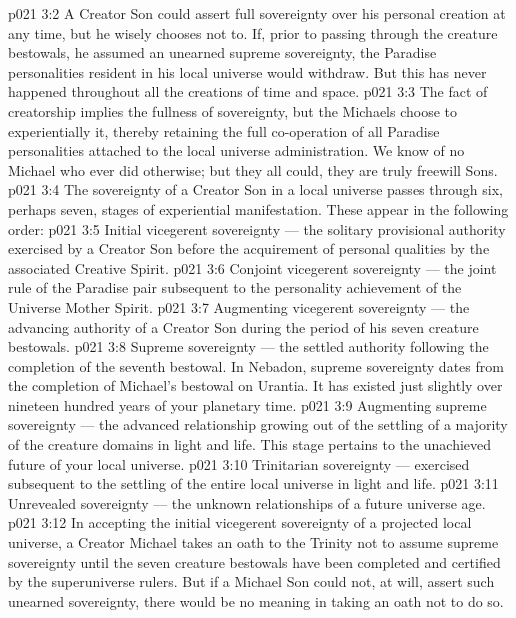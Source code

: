 \vs p021 3:2 \pc A Creator Son could assert full sovereignty over his personal creation at any time, but he wisely chooses not to. If, prior to passing through the creature bestowals, he assumed an unearned supreme sovereignty, the Paradise personalities resident in his local universe would withdraw. But this has never happened throughout all the creations of time and space.
\vs p021 3:3 The fact of creatorship implies the fullness of sovereignty, but the Michaels choose to experientially  it, thereby retaining the full co\hyp{}operation of all Paradise personalities attached to the local universe administration. We know of no Michael who ever did otherwise; but they all could, they are truly freewill Sons.
\vs p021 3:4 \pc The sovereignty of a Creator Son in a local universe passes through six, perhaps seven, stages of experiential manifestation. These appear in the following order:
\vs p021 3:5 \bibnobreakspace Initial vicegerent sovereignty --- the solitary provisional authority exercised by a Creator Son before the acquirement of personal qualities by the associated Creative Spirit.
\vs p021 3:6 \pc {}\bibnobreakspace Conjoint vicegerent sovereignty --- the joint rule of the Paradise pair subsequent to the personality achievement of the Universe Mother Spirit.
\vs p021 3:7 \pc {}\bibnobreakspace Augmenting vicegerent sovereignty --- the advancing authority of a Creator Son during the period of his seven creature bestowals.
\vs p021 3:8 \pc {}\bibnobreakspace Supreme sovereignty --- the settled authority following the completion of the seventh bestowal. In Nebadon, supreme sovereignty dates from the completion of Michael’s bestowal on Urantia. It has existed just slightly over nineteen hundred years of your planetary time.
\vs p021 3:9 \pc {}\bibnobreakspace Augmenting supreme sovereignty --- the advanced relationship growing out of the settling of a majority of the creature domains in light and life. This stage pertains to the unachieved future of your local universe.
\vs p021 3:10 \pc {}\bibnobreakspace Trinitarian sovereignty --- exercised subsequent to the settling of the entire local universe in light and life.
\vs p021 3:11 \pc {}\bibnobreakspace Unrevealed sovereignty --- the unknown relationships of a future universe age.
\vs p021 3:12 \pc In accepting the initial vicegerent sovereignty of a projected local universe, a Creator Michael takes an oath to the Trinity not to assume supreme sovereignty until the seven creature bestowals have been completed and certified by the superuniverse rulers. But if a Michael Son could not, at will, assert such unearned sovereignty, there would be no meaning in taking an oath not to do so.
